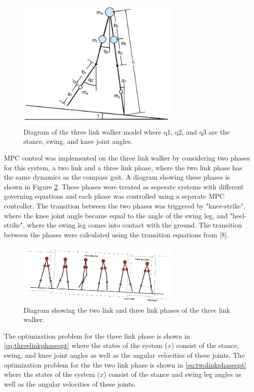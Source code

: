 \documentclass{./springer/svjour3}
\begin{document}
\begin{figure}[!h]
  \centering
  \includegraphics[width=8cm]{./figures/threeleg.png}
  \caption{Diagram of the three link walker model where q1, q2, and q3 are the stance, swing, and knee joint angles.}
  \label{fig:threeleg}
\end{figure}

MPC control was implemented on the three link walker by considering two phases for this system, a two link and a 
three link phase, where the two link phase has the same dynamics as the compass gait. A diagram showing these phases is shown in 
Figure \ref{fig:threelegstates}. These phases were treated as seperate systems with different governing equations and 
each phase was controlled using a seperate MPC controller. The transition between the two phases was triggered by "knee-strike", where the 
knee joint angle became equal to the angle of the swing leg, and "heel-strike", where the swing leg comes into contact with the ground. The 
transition between the phases were calculated using the transition equations from [8].
\begin{figure}[!h]
  \centering
  \includegraphics[width=8cm]{./figures/threelegstates.png}
  \caption{Diagram showing the two link and three link phases of the three link walker.}
  \label{fig:threelegstates}
\end{figure}

The optimization problem for the three link phase is shown in \ref{eq:threelinkphaseopt} where the states of the system ($x$) consist of 
the stance, swing, and knee joint angles as well as the angular velocities of these joints. The optimization problem for the the two link phase is 
shown in \ref{eq:twolinkphaseopt} where the states of the system ($x$) consist of the stance and swing leg angles as well as the angular velocities of these joints.
\end{document}
